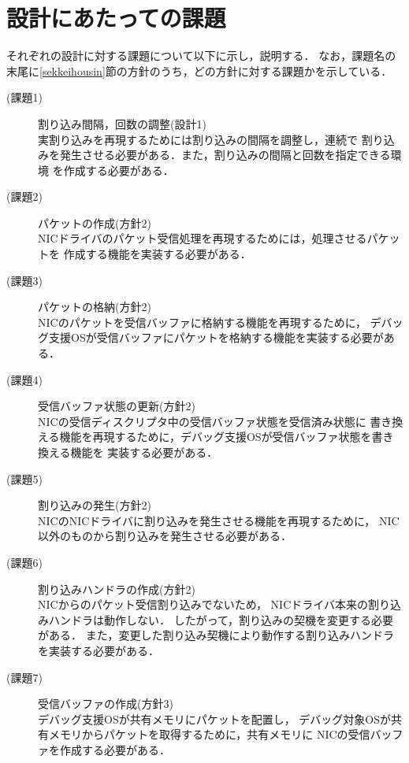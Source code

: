 \documentclass[tanilab-enum]{graduate}
\begin{document}
\section{設計にあたっての課題}\label{kadai}
それぞれの設計に対する課題について以下に示し，説明する．
なお，課題名の末尾に\ref{sekkeihousin}節の方針のうち，どの方針に対する課題かを示している．
\begin{description}
    \item[(課題1)]割り込み間隔，回数の調整(設計1)\\
        実割り込みを再現するためには割り込みの間隔を調整し，連続で
        割り込みを発生させる必要がある．また，割り込みの間隔と回数を指定できる環境
        を作成する必要がある．
    \item[(課題2)]パケットの作成(方針2)\\
        NICドライバのパケット受信処理を再現するためには，処理させるパケットを
        作成する機能を実装する必要がある．
    \item[(課題3)]パケットの格納(方針2)\\
        NICのパケットを受信バッファに格納する機能を再現するために，
        デバッグ支援OSが受信バッファにパケットを格納する機能を実装する必要がある．
    \item[(課題4)]受信バッファ状態の更新(方針2)\\
        NICの受信ディスクリプタ中の受信バッファ状態を受信済み状態に
        書き換える機能を再現するために，デバッグ支援OSが受信バッファ状態を書き換える機能を
        実装する必要がある．
    \item[(課題5)]割り込みの発生(方針2)\\
        NICのNICドライバに割り込みを発生させる機能を再現するために，
        NIC以外のものから割り込みを発生させる必要がある．
    \item[(課題6)]割り込みハンドラの作成(方針2)\\
        NICからのパケット受信割り込みでないため，
        NICドライバ本来の割り込みハンドラは動作しない．
        したがって，割り込みの契機を変更する必要がある．
        また，変更した割り込み契機により動作する割り込みハンドラを実装する必要がある．
    \item[(課題7)]受信バッファの作成(方針3)\\
        デバッグ支援OSが共有メモリにパケットを配置し，
        デバッグ対象OSが共有メモリからパケットを取得するために，共有メモリに
        NICの受信バッファを作成する必要がある．
\end{description}
\end{document}
